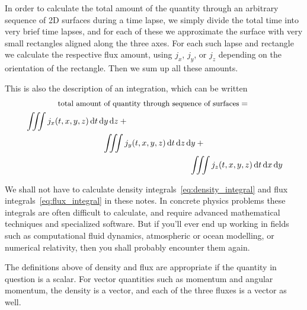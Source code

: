 \documentclass[a4paper,12pt,%
onecolumn,oneside,titlepage,%
british%
]{memoir}
\renewcommand*{\bm}[1]{\textpdfrender{TextRenderingMode=2,LineWidth=0.3pt}{\boldsymbol{#1}}}
\newcommand*{\di}{\mathrm{d}}%
\renewcommand*{\|}[1][]{\nonscript\:#1\vert\nonscript\:\mathopen{}}
\newcommand*{\yN}{N}
\newcommand*{\yJ}{J}
\begin{document}
In order to calculate the total amount of the quantity through an arbitrary sequence of 2D surfaces during a time lapse, we simply divide the total time into very brief time lapses, and for each of these we approximate the surface with very small rectangles aligned along the three axes. For each such lapse and rectangle we calculate the respective flux amount, using $j_{x}$, $j_{y}$, or $j_{z}$ depending on the orientation of the rectangle. Then we sum up all these amounts.
\begin{extra}
  This is also the description of an integration, which can be written
  \begin{multline}
    \label{eq:flux_integral}
    \text{\small total amount of quantity through sequence of surfaces} = {}\\
    \begin{multlined}[b][0.9\linewidth]
      \iiint j_{x}(t,x,y,z)\, \di t\, \di y\, \di z +{}
      \\\iiint j_{y}(t,x,y,z)\, \di t\, \di z\, \di y +{}
      \\\iiint j_{z}(t,x,y,z)\, \di t\, \di x\, \di y
    \end{multlined}
  \end{multline}

  We shall not have to calculate density integrals~\eqref{eq:density_integral} and flux integrals~\eqref{eq:flux_integral} in these notes. In concrete physics problems these integrals are often difficult to calculate, and require advanced mathematical techniques and specialized software. But if you'll ever end up working in fields such as computational fluid dynamics, atmospheric or ocean modelling, or numerical relativity, then you shall probably encounter them again.
\end{extra}

\medskip

The definitions above of density and flux are appropriate if the quantity in question is a scalar. For vector quantities such as momentum and angular momentum, the density is a vector, and each of the three fluxes is a vector as well.

\end{document}
